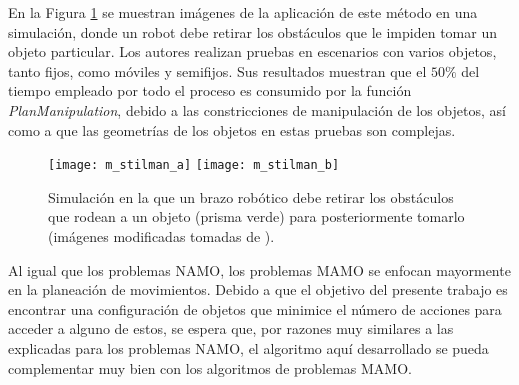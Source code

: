 En la Figura \ref{fig:4209604} se muestran imágenes de la aplicación de este método en una simulación, donde un robot debe retirar los obstáculos que le impiden tomar un objeto particular.
Los autores realizan pruebas en escenarios con varios objetos, tanto fijos, como móviles y semifijos.
Sus resultados muestran que el $50\%$ del tiempo empleado por todo el proceso es consumido por la función \textit{PlanManipulation}, debido a las constricciones de manipulación de los objetos, así como a que las geometrías de los objetos en estas pruebas son complejas.
%
\begin{figure}[H]
	\texttt{[image: m\_stilman\_a]}%
	\hspace{0.5cm}%
	\texttt{[image: m\_stilman\_b]}%
	\caption{Simulación en la que un brazo robótico debe retirar los obstáculos que rodean a un objeto (prisma verde) para posteriormente tomarlo (imágenes modificadas tomadas de \cite{4209604}).}
	\label{fig:4209604}
\end{figure}
%
Al igual que los problemas NAMO, los problemas MAMO se enfocan mayormente en la planeación de movimientos.
Debido a que el objetivo del presente trabajo es encontrar una configuración de objetos que minimice el número de acciones para acceder a alguno de estos, se espera que, por razones muy similares a las explicadas para los problemas NAMO, el algoritmo aquí desarrollado se pueda complementar muy bien con los algoritmos de problemas MAMO. 
%
%
%
%

